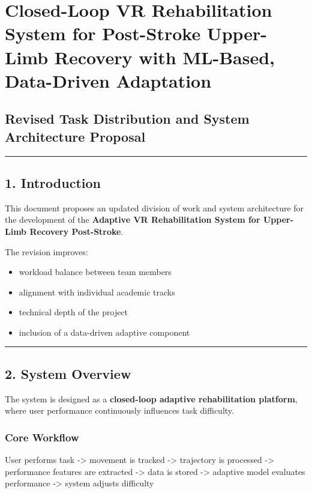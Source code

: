 \documentclass[11pt]{article}
\begin{document}
\section*{Closed-Loop VR Rehabilitation System for Post-Stroke Upper-Limb Recovery with ML-Based, Data-Driven Adaptation}

\subsection*{Revised Task Distribution and System Architecture Proposal}


\hrule


\subsection*{1. Introduction}


This document proposes an updated division of work and system architecture for the development of the \textbf{Adaptive VR Rehabilitation System for Upper-Limb Recovery Post-Stroke}.


The revision improves:

\begin{itemize}
\item workload balance between team members
\item alignment with individual academic tracks
\item technical depth of the project
\item inclusion of a data-driven adaptive component
\end{itemize}

\hrule


\subsection*{2. System Overview}


The system is designed as a \textbf{closed-loop adaptive rehabilitation platform}, where user performance continuously influences task difficulty.


\subsubsection*{Core Workflow}


User performs task -> movement is tracked -> trajectory is processed -> performance features are extracted -> data is stored -> adaptive model evaluates performance -> system adjusts difficulty
\end{document}
